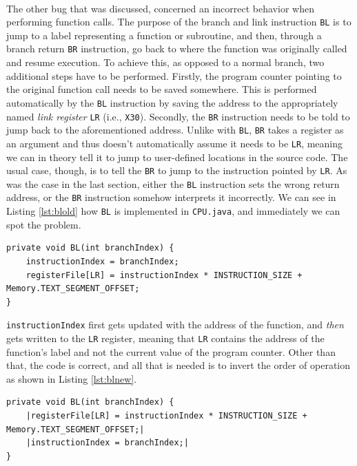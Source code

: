 \paragraph{}
The other bug that was discussed, concerned an incorrect behavior when performing function calls. The purpose of the branch and link instruction \verb|BL| is to jump to a label representing a function or subroutine, and then, through a branch return \verb|BR| instruction, go back to where the function was originally called and resume execution. To achieve this, as opposed to a normal branch, two additional steps have to be performed. Firstly, the program counter pointing to the original function call needs to be saved somewhere. This is performed automatically by the \verb|BL| instruction by saving the address to the appropriately named \emph{link register} \verb|LR| (i.e., \verb|X30|). Secondly, the \verb|BR| instruction needs to be told to jump back to the aforementioned address. Unlike with \verb|BL|, \verb|BR| takes a register as an argument and thus doesn't automatically assume it needs to be \verb|LR|, meaning we can in theory tell it to jump to user-defined locations in the source code. The usual case, though, is to tell the \verb|BR| to jump to the instruction pointed by \verb|LR|. As was the case in the last section, either the \verb|BL| instruction sets the wrong return address, or the \verb|BR| instruction somehow interprets it incorrectly. We can see in Listing \ref{lst:blold} how \verb|BL| is implemented in \verb|CPU.java|, and immediately we can spot the problem.
\begin{lstlisting}[float, caption={BL's implementation}, label={lst:blold}]
private void BL(int branchIndex) {
    instructionIndex = branchIndex;
    registerFile[LR] = instructionIndex * INSTRUCTION_SIZE + Memory.TEXT_SEGMENT_OFFSET;
}
\end{lstlisting}
\verb|instructionIndex| first  gets updated with the address of the function, and \emph{then} gets written to the \verb|LR| register, meaning that \verb|LR| contains the address of the function's label and not the current value of the program counter. Other than that, the code is correct, and all that is needed is to invert the order of operation as shown in Listing \ref{lst:blnew}.
\begin{lstlisting}[float, caption={BL's correct implementation}, label={lst:blnew}]
private void BL(int branchIndex) {
    |registerFile[LR] = instructionIndex * INSTRUCTION_SIZE + Memory.TEXT_SEGMENT_OFFSET;|
    |instructionIndex = branchIndex;|
}
\end{lstlisting}
